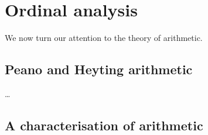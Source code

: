 %
\chapter{Ordinal analysis}
%
We now turn our attention to the theory of arithmetic.

\section{Peano and Heyting arithmetic}
%
\begin{definition}
	\dots 
\end{definition}
%
\section{A characterisation of arithmetic}
%
\begin{theorem}
	
\end{theorem}

